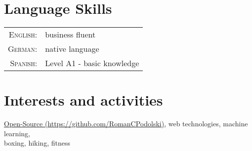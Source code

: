 \documentclass[a4paper,10pt]{article} %
\begin{document}
 
 
 
 
 
\section{Language Skills}
 
\begin{tabular}{rl}
\textsc{English:} & business fluent\\
 
\textsc{German:} & native language\\
 
\textsc{Spanish:} & Level A1 - basic knowledge \\
\end{tabular}
 
 
 
\section{Interests and activities}
 
\href{https://github.com/RomanCPodolski}{Open-Source (\faGithub https://github.com/RomanCPodolski)}, web technologies, machine learning, \\
boxing, hiking, fitness
 
 
\newpage
 
\end{document}

